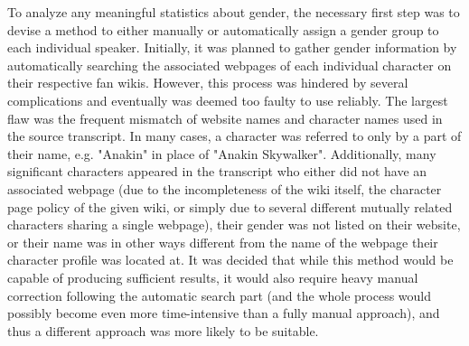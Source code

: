 \documentclass[a4paper, 11pt]{article}
\begin{document}
To analyze any meaningful statistics about gender, the necessary first step was to devise a method to either manually or automatically assign a gender group to each individual speaker. Initially, it was planned to gather gender information by automatically searching the associated webpages of each individual character on their respective fan wikis. However, this process was hindered by several complications and eventually was deemed too faulty to use reliably. The largest flaw was the frequent mismatch of website names and character names used in the source transcript. In many cases, a character was referred to only by a part of their name, e.g. "Anakin" in place of "Anakin Skywalker". Additionally, many significant characters appeared in the transcript who either did not have an associated webpage (due to the incompleteness of the wiki itself, the character page policy of the given wiki, or simply due to several different mutually related characters sharing a single webpage), their gender was not listed on their website, or their name was in other ways different from the name of the webpage their character profile was located at. It was decided that while this method would be capable of producing sufficient results, it would also require heavy manual correction following the automatic search part (and the whole process would possibly become even more time-intensive than a fully manual approach), and thus a different approach was more likely to be suitable.
\end{document}
